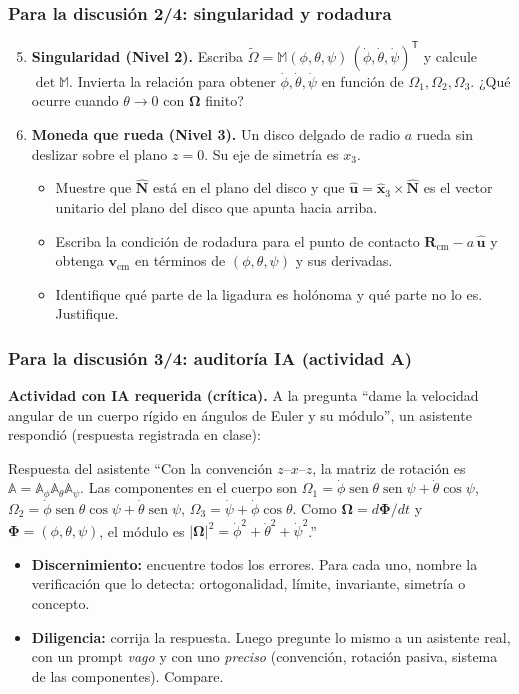 \documentclass[spanish]{beamer}
\providecommand{\sen}{\operatorname{sen}}       %
\newcommand{\vect}[1]{\mathbf{#1}}              %
\newcommand{\uv}[1]{\hat{\mathbf{#1}}}          %
\newcommand{\bOmega}{\bm{\Omega}}               %
\newcommand{\Rot}{\mathbb{A}}                   %
\newcommand{\colCue}[1]{\tilde{\mathsf{#1}}}    %
\newcommand{\tr}{\mathsf{T}}                    %
\begin{document}
\begin{frame}
  \frametitle{Para la discusión 2/4: singularidad y rodadura}
  \begin{enumerate}
    \setcounter{enumi}{4}
    \item<1-> \textbf{Singularidad (Nivel 2).} Escriba
          $\colCue{\Omega}=\mathbb{M}(\phi,\theta,\psi)\,(\dot\phi,\dot\theta,\dot\psi)^{\tr}$
          y calcule $\det\mathbb{M}$. Invierta la relación para obtener
          $\dot\phi,\dot\theta,\dot\psi$ en función de $\Omega_1,\Omega_2,\Omega_3$.
          ¿Qué ocurre cuando $\theta\to0$ con $\bOmega$ finito?
    \item<2-> \textbf{Moneda que rueda (Nivel 3).} Un disco delgado de radio $a$
          rueda sin deslizar sobre el plano $z=0$. Su eje de simetría es $x_3$.
      \begin{itemize}
        \item Muestre que $\uv{N}$ está en el plano del disco y que
              $\uv{u}=\uv{x}_3\times\uv{N}$ es el vector unitario del plano del disco
              que apunta hacia arriba.
        \item Escriba la condición de rodadura para el punto de contacto
              $\vect{R}_{\mathrm{cm}}-a\,\uv{u}$ y obtenga $\vect{v}_{\mathrm{cm}}$ en
              términos de $(\phi,\theta,\psi)$ y sus derivadas.
        \item Identifique qué parte de la ligadura es holónoma y qué parte no lo es.
              Justifique.
      \end{itemize}
  \end{enumerate}
\end{frame}

\begin{frame}
  \frametitle{Para la discusión 3/4: auditoría IA (actividad A)}
  \textbf{Actividad con IA requerida (crítica).} A la pregunta ``dame la velocidad
  angular de un cuerpo rígido en ángulos de Euler y su módulo'', un asistente
  respondió (respuesta registrada en clase):
  \begin{exampleblock}{Respuesta del asistente}
    \footnotesize
    ``Con la convención $z$–$x$–$z$, la matriz de rotación es
    $\Rot=\Rot_\phi\Rot_\theta\Rot_\psi$. Las componentes en el cuerpo son
    $\Omega_1=\dot\phi\sen\theta\sen\psi+\dot\theta\cos\psi$,
    $\Omega_2=\dot\phi\sen\theta\cos\psi+\dot\theta\sen\psi$,
    $\Omega_3=\dot\psi+\dot\phi\cos\theta$.
    Como $\bOmega=d\bm{\Phi}/dt$ y $\bm{\Phi}=(\phi,\theta,\psi)$, el módulo es
    $|\bOmega|^2=\dot\phi^2+\dot\theta^2+\dot\psi^2$.''
  \end{exampleblock}
  \begin{itemize}
    \item<2-> \textbf{Discernimiento:} encuentre todos los errores. Para cada uno, nombre
          la verificación que lo detecta: ortogonalidad, límite, invariante, simetría o
          concepto.
    \item<3-> \textbf{Diligencia:} corrija la respuesta. Luego pregunte lo mismo a un
          asistente real, con un prompt \emph{vago} y con uno \emph{preciso}
          (convención, rotación pasiva, sistema de las componentes). Compare.
  \end{itemize}
\end{frame}
\end{document}
